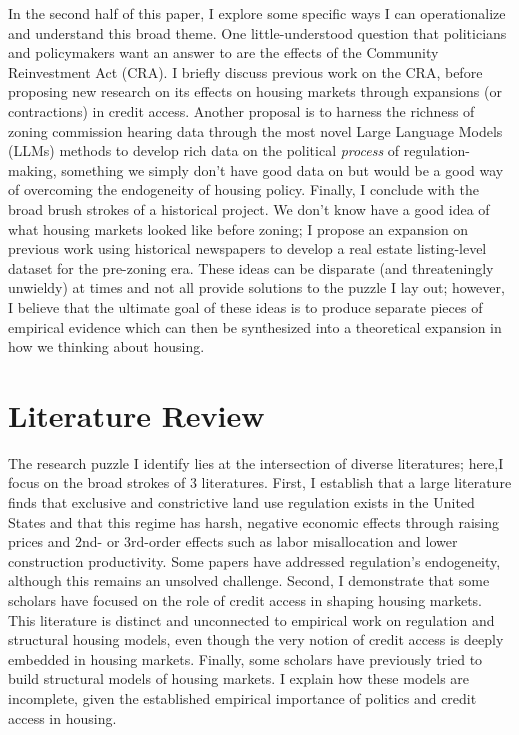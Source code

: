 \documentclass{article}[11pt]
\begin{document}
In the second half of this paper, I explore some specific ways I can operationalize and understand this broad theme. One little-understood question that politicians and policymakers want an answer to are the effects of the Community Reinvestment Act (CRA). I briefly discuss previous work on the CRA, before proposing new research on its effects on housing markets through expansions (or contractions) in credit access. Another proposal is to harness the richness of zoning commission hearing data through the most novel Large Language Models (LLMs) methods to develop rich data on the political \textit{process} of regulation-making, something we simply don't have good data on but would be a good way of overcoming the endogeneity of housing policy. Finally, I conclude with the broad brush strokes of a historical project. We don't know have a good idea of what housing markets looked like before zoning; I propose an expansion on previous work using historical newspapers to develop a real estate listing-level dataset for the pre-zoning era. These ideas can be disparate (and threateningly unwieldy) at times and not all provide solutions to the puzzle I lay out; however, I believe that the ultimate goal of these ideas is to produce separate pieces of empirical evidence which can then be synthesized into a theoretical expansion in how we thinking about housing.

\section{Literature Review}

The research puzzle I identify lies at the intersection of diverse literatures; here,I focus on the broad strokes of 3 literatures. First, I establish that a large literature finds that exclusive and constrictive land use regulation exists in the United States and that this regime has harsh, negative economic effects through raising prices and 2nd- or 3rd-order effects such as labor misallocation and lower construction productivity. Some papers have addressed regulation's endogeneity, although this remains an unsolved challenge. Second, I demonstrate that some scholars have focused on the role of credit access in shaping housing markets. This literature is distinct and unconnected to empirical work on regulation and structural housing models, even though the very notion of credit access is deeply embedded in housing markets. Finally, some scholars have previously tried to build structural models of housing markets. I explain how these models are incomplete, given the established empirical importance of politics and credit access in housing.
		
\end{document}
